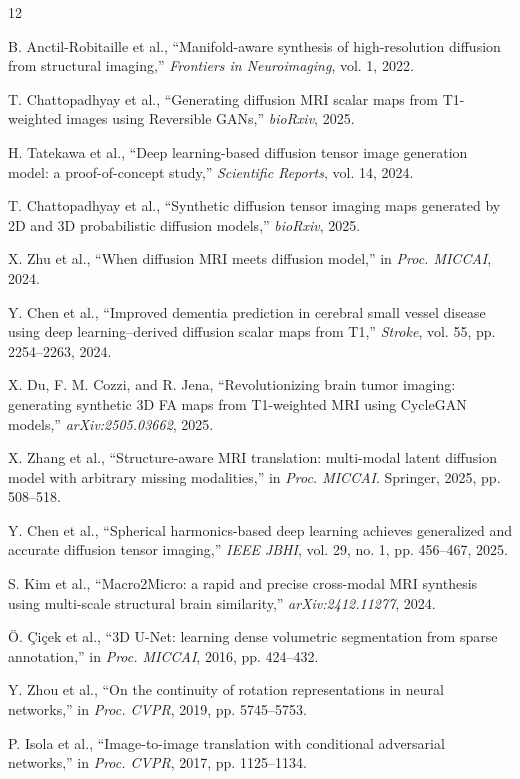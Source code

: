 \documentclass[conference,compsoc]{IEEEtran}
\begin{document}
\begin{thebibliography}{12}

B. Anctil-Robitaille et al., ``Manifold-aware synthesis of high-resolution diffusion from structural imaging,'' \textit{Frontiers in Neuroimaging}, vol. 1, 2022.

T. Chattopadhyay et al., ``Generating diffusion MRI scalar maps from T1-weighted images using Reversible GANs,'' \textit{bioRxiv}, 2025.

H. Tatekawa et al., ``Deep learning-based diffusion tensor image generation model: a proof-of-concept study,'' \textit{Scientific Reports}, vol. 14, 2024.

T. Chattopadhyay et al., ``Synthetic diffusion tensor imaging maps generated by 2D and 3D probabilistic diffusion models,'' \textit{bioRxiv}, 2025.

X. Zhu et al., ``When diffusion MRI meets diffusion model,'' in \textit{Proc. MICCAI}, 2024.

Y. Chen et al., ``Improved dementia prediction in cerebral small vessel disease using deep learning--derived diffusion scalar maps from T1,'' \textit{Stroke}, vol. 55, pp. 2254--2263, 2024.

X. Du, F. M. Cozzi, and R. Jena, ``Revolutionizing brain tumor imaging: generating synthetic 3D FA maps from T1-weighted MRI using CycleGAN models,'' \textit{arXiv:2505.03662}, 2025.

X. Zhang et al., ``Structure-aware MRI translation: multi-modal latent diffusion model with arbitrary missing modalities,'' in \textit{Proc. MICCAI}. Springer, 2025, pp. 508--518.

Y. Chen et al., ``Spherical harmonics-based deep learning achieves generalized and accurate diffusion tensor imaging,'' \textit{IEEE JBHI}, vol. 29, no. 1, pp. 456--467, 2025.

S. Kim et al., ``Macro2Micro: a rapid and precise cross-modal MRI synthesis using multi-scale structural brain similarity,'' \textit{arXiv:2412.11277}, 2024.

\"O. \c{C}i\c{c}ek et al., ``3D U-Net: learning dense volumetric segmentation from sparse annotation,'' in \textit{Proc. MICCAI}, 2016, pp. 424--432.

Y. Zhou et al., ``On the continuity of rotation representations in neural networks,'' in \textit{Proc. CVPR}, 2019, pp. 5745--5753.

P. Isola et al., ``Image-to-image translation with conditional adversarial networks,'' in \textit{Proc. CVPR}, 2017, pp. 1125--1134.

\end{thebibliography}
\end{document}

